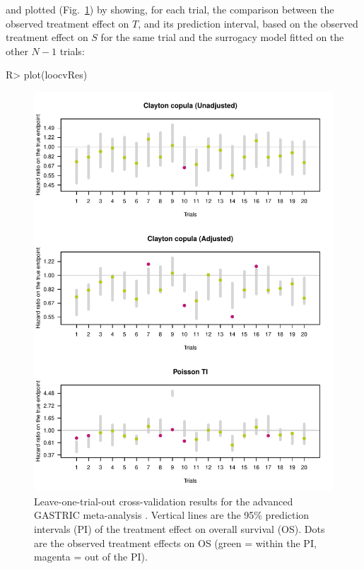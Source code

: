 \documentclass[article,shortnames, nojss]{jss}\usepackage[]{graphicx}\usepackage[]{color}
\begin{document}
and plotted (Fig.~\ref{fig:loocv}) by showing, 
  for each trial, the comparison between the observed 
  treatment effect on $T$, and its prediction interval,
  based on the observed treatment effect on $S$ for the same trial
  and the surrogacy model fitted on the other $N-1$ trials:
\begin{Schunk}
\begin{Sinput}
R>   plot(loocvRes)
\end{Sinput}
\begin{figure}
\includegraphics[width=\textwidth]{figure/loocv-1} \caption[Leave-one-trial-out cross-validation results for the advanced GASTRIC meta-analysis \citep{GASTRIC13}]{Leave-one-trial-out cross-validation results for the advanced GASTRIC meta-analysis \citep{GASTRIC13}. Vertical lines are the 95\% prediction intervals (PI) of the treatment effect on overall survival (OS). Dots are the observed treatment effects on OS (green = within the PI, magenta = out of the PI).}\label{fig:loocv}
\end{figure}
\end{Schunk}
\end{document}
